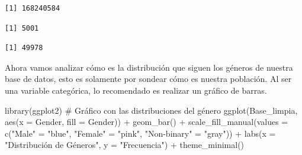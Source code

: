 \documentclass[
  letterpaper,
  DIV=11,
  numbers=noendperiod]{scrreprt}
\newenvironment{Shaded}{\begin{snugshade}}{\end{snugshade}}
\newcommand{\AttributeTok}[1]{\textcolor[rgb]{0.40,0.45,0.13}{#1}}
\newcommand{\CommentTok}[1]{\textcolor[rgb]{0.37,0.37,0.37}{#1}}
\newcommand{\FunctionTok}[1]{\textcolor[rgb]{0.28,0.35,0.67}{#1}}
\newcommand{\NormalTok}[1]{\textcolor[rgb]{0.00,0.23,0.31}{#1}}
\newcommand{\OtherTok}[1]{\textcolor[rgb]{0.00,0.23,0.31}{#1}}
\newcommand{\SpecialCharTok}[1]{\textcolor[rgb]{0.37,0.37,0.37}{#1}}
\newcommand{\StringTok}[1]{\textcolor[rgb]{0.13,0.47,0.30}{#1}}
\begin{document}
\begin{Shaded}
\end{Shaded}

\begin{verbatim}
[1] 168240584
\end{verbatim}

\begin{Shaded}
\end{Shaded}

\begin{verbatim}
[1] 5001
\end{verbatim}

\begin{Shaded}
\end{Shaded}

\begin{verbatim}
[1] 49978
\end{verbatim}

Ahora vamos analizar cómo es la distribución que siguen los géneros de
nuestra base de datos, esto es solamente por sondear cómo es nuestra
población. Al ser una variable categórica, lo recomendado es realizar un
gráfico de barras.

\begin{Shaded}
\begin{Highlighting}[]
\FunctionTok{library}\NormalTok{(ggplot2)}
\CommentTok{\# Gráfico con las distribuciones del género}
\FunctionTok{ggplot}\NormalTok{(Base\_limpia, }\FunctionTok{aes}\NormalTok{(}\AttributeTok{x =}\NormalTok{ Gender, }\AttributeTok{fill =}\NormalTok{ Gender)) }\SpecialCharTok{+}
  \FunctionTok{geom\_bar}\NormalTok{() }\SpecialCharTok{+}
  \FunctionTok{scale\_fill\_manual}\NormalTok{(}\AttributeTok{values =} \FunctionTok{c}\NormalTok{(}\StringTok{"Male"} \OtherTok{=} \StringTok{"blue"}\NormalTok{, }\StringTok{"Female"} \OtherTok{=} \StringTok{"pink"}\NormalTok{, }\StringTok{"Non{-}binary"} \OtherTok{=} \StringTok{"gray"}\NormalTok{)) }\SpecialCharTok{+}
  \FunctionTok{labs}\NormalTok{(}\AttributeTok{x =} \StringTok{"Distribución de Géneros"}\NormalTok{, }\AttributeTok{y =} \StringTok{"Frecuencia"}\NormalTok{) }\SpecialCharTok{+} \FunctionTok{theme\_minimal}\NormalTok{()}
\end{Highlighting}
\end{Shaded}
\end{document}
